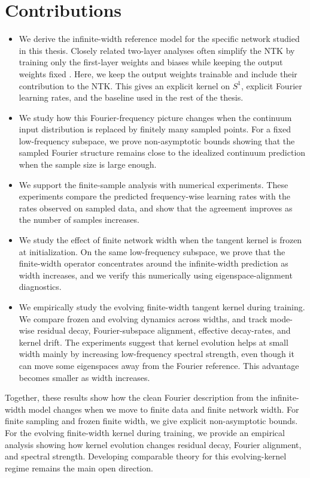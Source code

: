 \section{Contributions}
\label{sec:contributions}

\begin{itemize}
	\item We derive the infinite-width reference model for the specific network
	      studied in this thesis. Closely related two-layer analyses often
	      simplify the NTK by training only the first-layer weights and biases
	      while keeping the output weights fixed
	      \citep{basri2019convergence,basri2020frequencybiasneuralnetworks}.
	      Here, we keep the output weights trainable and include their
	      contribution to the NTK. This gives an explicit kernel on \(S^1\),
	      explicit Fourier learning rates, and the baseline used in the rest of
	      the thesis.

	\item We study how this Fourier-frequency picture changes when the continuum
	      input distribution is replaced by finitely many sampled points. For a
	      fixed low-frequency subspace, we prove non-asymptotic bounds showing
	      that the sampled Fourier structure remains close to the idealized
	      continuum prediction when the sample size is large enough.

	\item We support the finite-sample analysis with numerical experiments. These
	      experiments compare the predicted frequency-wise learning rates with
	      the rates observed on sampled data, and show that the agreement improves
	      as the number of samples increases.

	\item We study the effect of finite network width when the tangent kernel is
	      frozen at initialization. On the same low-frequency subspace, we prove
	      that the finite-width operator concentrates around the infinite-width
	      prediction as width increases, and we verify this numerically using
	      eigenspace-alignment diagnostics.

	\item We empirically study the evolving finite-width tangent kernel during
	      training. We compare frozen and evolving dynamics across widths, and track
	      mode-wise residual decay, Fourier-subspace alignment, effective decay-rates,
	      and kernel drift. The experiments suggest that kernel evolution
	      helps at small width mainly by increasing low-frequency spectral
	      strength, even though it can move some eigenspaces away from the Fourier
	      reference. This advantage becomes smaller as width increases.
\end{itemize}

Together, these results show how the clean Fourier description from the
infinite-width model changes when we move to finite data and finite network
width. For finite sampling and frozen finite width, we give explicit
non-asymptotic bounds. For the evolving finite-width kernel during training, we
provide an empirical analysis showing how kernel evolution changes residual
decay, Fourier alignment, and spectral strength. Developing comparable theory
for this evolving-kernel regime remains the main open direction.

